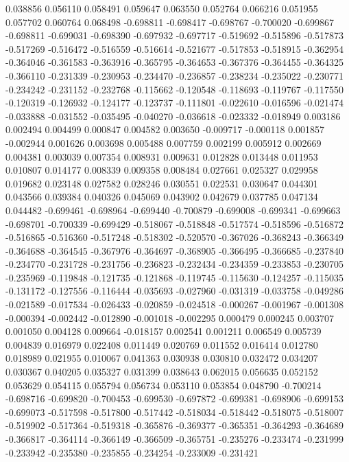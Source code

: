 0.038856
0.056110
0.058491
0.059647
0.063550
0.052764
0.066216
0.051955
0.057702
0.060764
0.068498
-0.698811
-0.698417
-0.698767
-0.700020
-0.699867
-0.698811
-0.699031
-0.698390
-0.697932
-0.697717
-0.519692
-0.515896
-0.517873
-0.517269
-0.516472
-0.516559
-0.516614
-0.521677
-0.517853
-0.518915
-0.362954
-0.364046
-0.361583
-0.363916
-0.365795
-0.364653
-0.367376
-0.364455
-0.364325
-0.366110
-0.231339
-0.230953
-0.234470
-0.236857
-0.238234
-0.235022
-0.230771
-0.234242
-0.231152
-0.232768
-0.115662
-0.120548
-0.118693
-0.119767
-0.117550
-0.120319
-0.126932
-0.124177
-0.123737
-0.111801
-0.022610
-0.016596
-0.021474
-0.033888
-0.031552
-0.035495
-0.040270
-0.036618
-0.023332
-0.018949
0.003186
0.002494
0.004499
0.000847
0.004582
0.003650
-0.009717
-0.000118
0.001857
-0.002944
0.001626
0.003698
0.005488
0.007759
0.002199
0.005912
0.002669
0.004381
0.003039
0.007354
0.008931
0.009631
0.012828
0.013448
0.011953
0.010807
0.014177
0.008339
0.009358
0.008484
0.027661
0.025327
0.029958
0.019682
0.023148
0.027582
0.028246
0.030551
0.022531
0.030647
0.044301
0.043566
0.039384
0.040326
0.045069
0.043902
0.042679
0.037785
0.047134
0.044482
-0.699461
-0.698964
-0.699440
-0.700879
-0.699008
-0.699341
-0.699663
-0.698701
-0.700339
-0.699429
-0.518067
-0.518848
-0.517574
-0.518596
-0.516872
-0.516865
-0.516360
-0.517248
-0.518302
-0.520570
-0.367026
-0.368243
-0.366349
-0.364688
-0.364545
-0.367976
-0.364697
-0.368905
-0.366495
-0.366685
-0.237840
-0.234770
-0.231728
-0.231756
-0.236823
-0.232434
-0.234359
-0.233853
-0.230705
-0.235969
-0.119848
-0.121735
-0.121868
-0.119745
-0.115630
-0.124257
-0.115035
-0.131172
-0.127556
-0.116444
-0.035693
-0.027960
-0.031319
-0.033758
-0.049286
-0.021589
-0.017534
-0.026433
-0.020859
-0.024518
-0.000267
-0.001967
-0.001308
-0.000394
-0.002442
-0.012890
-0.001018
-0.002295
0.000479
0.000245
0.003707
0.001050
0.004128
0.009664
-0.018157
0.002541
0.001211
0.006549
0.005739
0.004839
0.016979
0.022408
0.011449
0.020769
0.011552
0.016414
0.012780
0.018989
0.021955
0.010067
0.041363
0.030938
0.030810
0.032472
0.034207
0.030367
0.040205
0.035327
0.031399
0.038643
0.062015
0.056635
0.052152
0.053629
0.054115
0.055794
0.056734
0.053110
0.053854
0.048790
-0.700214
-0.698716
-0.699820
-0.700453
-0.699530
-0.697872
-0.699381
-0.698906
-0.699153
-0.699073
-0.517598
-0.517800
-0.517442
-0.518034
-0.518442
-0.518075
-0.518007
-0.519902
-0.517364
-0.519318
-0.365876
-0.369377
-0.365351
-0.364293
-0.364689
-0.366817
-0.364114
-0.366149
-0.366509
-0.365751
-0.235276
-0.233474
-0.231999
-0.233942
-0.235380
-0.235855
-0.234254
-0.233009
-0.231421
